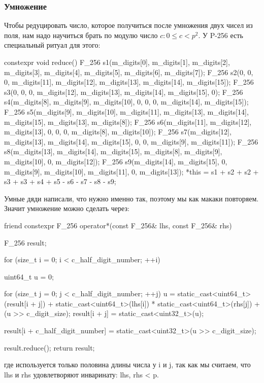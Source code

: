 \subsubsection{Умножение}
Чтобы редуцировать число, которое получиться после умножения двух чисел из поля, нам надо научиться брать по модулю число $c\colon 0\leqslant c < p^2$. У P-256 есть специальный ритуал для этого:
\begin{cppcode}
constexpr void reduce() {
    F_256 s1({m_digits[0],
              m_digits[1],
              m_digits[2],
              m_digits[3],
              m_digits[4],
              m_digits[5],
              m_digits[6],
              m_digits[7]});
    F_256 s2({0, 0, 0, m_digits[11], m_digits[12], m_digits[13], m_digits[14], m_digits[15]});
    F_256 s3({0, 0, 0, m_digits[12], m_digits[13], m_digits[14], m_digits[15], 0});
    F_256 s4({m_digits[8], m_digits[9], m_digits[10], 0, 0, 0, m_digits[14], m_digits[15]});
    F_256 s5({m_digits[9],
              m_digits[10],
              m_digits[11],
              m_digits[13],
              m_digits[14],
              m_digits[15],
              m_digits[13],
              m_digits[8]});
    F_256 s6({m_digits[11], m_digits[12], m_digits[13], 0, 0, 0, m_digits[8], m_digits[10]});
    F_256 s7({m_digits[12], m_digits[13], m_digits[14], m_digits[15], 0, 0, m_digits[9], m_digits[11]});
    F_256 s8({m_digits[13],
              m_digits[14],
              m_digits[15],
              m_digits[8],
              m_digits[9],
              m_digits[10],
              0,
              m_digits[12]});
    F_256 s9({m_digits[14], m_digits[15], 0, m_digits[9], m_digits[10], m_digits[11], 0, m_digits[13]});
    *this = s1 + s2 + s2 + s3 + s3 + s4 + s5 - s6 - s7 - s8 - s9;
}
\end{cppcode}
Умные дяди написали, что нужно именно так, поэтому мы как макаки повторяем. Значит умножение можно сделать через:
\begin{cppcode}
friend constexpr F_256 operator*(const F_256& lhs, const F_256& rhs) {
    F_256 result;

    for (size_t i = 0; i < c_half_digit_number; ++i) {
        uint64_t u = 0;

        for (size_t j = 0; j < c_half_digit_number; ++j) {
            u = static_cast<uint64_t>(result[i + j])
              + static_cast<uint64_t>(lhs[i]) * static_cast<uint64_t>(rhs[j]) + (u >> c_digit_size);
            result[i + j] = static_cast<uint32_t>(u);
        }

        result[i + c_half_digit_number] = static_cast<uint32_t>(u >> c_digit_size);
    }

    result.reduce();
    return result;
}
\end{cppcode}
где используется только половина длины числа у i и j, так как мы считаем, что lhs и rhs удовлетворяют инваринату: lhs, rhs < p. 

